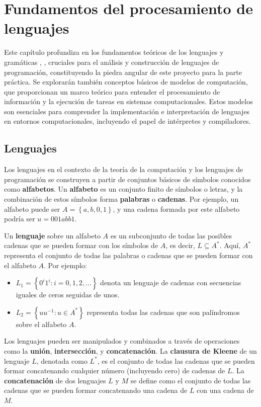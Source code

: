 \chapter{\textbf{Fundamentos del procesamiento de lenguajes}}
Este capítulo profundiza en los fundamentos teóricos de los lenguajes y gramáticas \cite{aho1990compiladores}, \cite{hopcroft2010introduccion}, cruciales para el análisis y construcción de lenguajes de programación, constituyendo la piedra angular de este proyecto para la parte práctica. Se explorarán también conceptos básicos de modelos de computación, que proporcionan un marco teórico para entender el procesamiento de información y la ejecución de tareas en sistemas computacionales. Estos modelos son esenciales para comprender la implementación e interpretación de lenguajes en entornos computacionales, incluyendo el papel de intérpretes y compiladores.

\section{Lenguajes}\label{section:languages}
Los lenguajes en el contexto de la teoría de la computación y los lenguajes de programación se construyen a partir de conjuntos básicos de símbolos conocidos como \textbf{alfabetos}. Un \textbf{alfabeto} es un conjunto finito de símbolos o letras, y la combinación de estos símbolos forma \textbf{palabras} o \textbf{cadenas}. Por ejemplo, un alfabeto puede ser $A = \left\lbrace a, b, 0, 1 \right\rbrace$, y una cadena formada por este alfabeto podría ser $u = 001abb1$.

Un \textbf{lenguaje} sobre un alfabeto $A$ es un subconjunto de todas las posibles cadenas que se pueden formar con los símbolos de $A$, es decir, $L \subseteq A^*$. Aquí, $A^*$ representa el conjunto de todas las palabras o cadenas que se pueden formar con el alfabeto $A$. Por ejemplo:

\begin{itemize}
\item $L_1 = \left\lbrace 0^i 1^i : i = 0,1,2,\ldots \right\rbrace$ denota un lenguaje de cadenas con secuencias iguales de ceros seguidas de unos.
\item $L_2 = \left\lbrace uu^{-1} : u \in A^* \right\rbrace$ representa todas las cadenas que son palíndromos sobre el alfabeto $A$.
\end{itemize}

Los lenguajes pueden ser manipulados y combinados a través de operaciones como la \textbf{unión}, \textbf{intersección}, y \textbf{concatenación}. La \textbf{clausura de Kleene} de un lenguaje $L$, denotada como $L^*$, es el conjunto de todas las cadenas que se pueden formar concatenando cualquier número (incluyendo cero) de cadenas de $L$. La \textbf{concatenación} de dos lenguajes $L$ y $M$ se define como el conjunto de todas las cadenas que se pueden formar concatenando una cadena de $L$ con una cadena de $M$.

